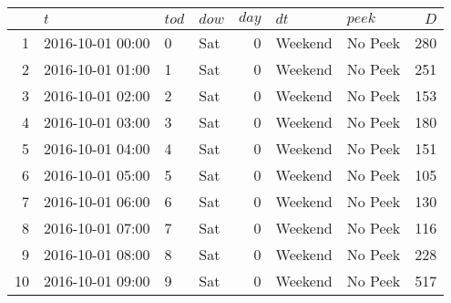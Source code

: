 \begin{tabular}{rlllrllr}
  & $\mathit{t}$ & $\mathit{tod}$ & $\mathit{dow}$ & $\mathit{day}$ & $\mathit{dt}$ & $\mathit{peek}$ & $\mathit{D}$ \\ 
  \hline
\hline
1 & 2016-10-01 00:00 & 0 & Sat &   0 & Weekend & No Peek & 280 \\ 
   \hline
2 & 2016-10-01 01:00 & 1 & Sat &   0 & Weekend & No Peek & 251 \\ 
   \hline
3 & 2016-10-01 02:00 & 2 & Sat &   0 & Weekend & No Peek & 153 \\ 
   \hline
4 & 2016-10-01 03:00 & 3 & Sat &   0 & Weekend & No Peek & 180 \\ 
   \hline
5 & 2016-10-01 04:00 & 4 & Sat &   0 & Weekend & No Peek & 151 \\ 
   \hline
6 & 2016-10-01 05:00 & 5 & Sat &   0 & Weekend & No Peek & 105 \\ 
   \hline
7 & 2016-10-01 06:00 & 6 & Sat &   0 & Weekend & No Peek & 130 \\ 
   \hline
8 & 2016-10-01 07:00 & 7 & Sat &   0 & Weekend & No Peek & 116 \\ 
   \hline
9 & 2016-10-01 08:00 & 8 & Sat &   0 & Weekend & No Peek & 228 \\ 
   \hline
10 & 2016-10-01 09:00 & 9 & Sat &   0 & Weekend & No Peek & 517 \\ 
  \end{tabular}
